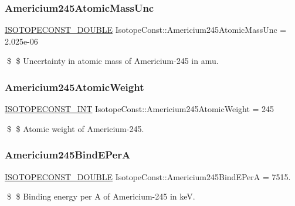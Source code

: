 \subsubsection{\texorpdfstring{Americium245\+Atomic\+Mass\+Unc}{Americium245AtomicMassUnc}}
{\footnotesize\ttfamily \mbox{\hyperlink{group___isotope_const-_macros_ga8f45a7272ce02c0b4c65c44636ed719a}{I\+S\+O\+T\+O\+P\+E\+C\+O\+N\+S\+T\+\_\+\+D\+O\+U\+B\+LE}} Isotope\+Const\+::\+Americium245\+Atomic\+Mass\+Unc = 2.\+025e-\/06}

\$ \$ Uncertainty in atomic mass of Americium-\/245 in amu. \mbox{\label{group___isotope_const-_americium-_am245_gafab58670e8d3d3e37ea662c4f2c9570b}} 
\subsubsection{\texorpdfstring{Americium245\+Atomic\+Weight}{Americium245AtomicWeight}}
{\footnotesize\ttfamily \mbox{\hyperlink{group___isotope_const-_macros_ga5f18360b3e99483a35c32d789e62621c}{I\+S\+O\+T\+O\+P\+E\+C\+O\+N\+S\+T\+\_\+\+I\+NT}} Isotope\+Const\+::\+Americium245\+Atomic\+Weight = 245}

\$ \$ Atomic weight of Americium-\/245. \mbox{\label{group___isotope_const-_americium-_am245_ga041e34cbf7275decb14b683bc0d50d92}} 
\subsubsection{\texorpdfstring{Americium245\+Bind\+E\+PerA}{Americium245BindEPerA}}
{\footnotesize\ttfamily \mbox{\hyperlink{group___isotope_const-_macros_ga8f45a7272ce02c0b4c65c44636ed719a}{I\+S\+O\+T\+O\+P\+E\+C\+O\+N\+S\+T\+\_\+\+D\+O\+U\+B\+LE}} Isotope\+Const\+::\+Americium245\+Bind\+E\+PerA = 7515.}

\$ \$ Binding energy per A of Americium-\/245 in keV. \mbox{\label{group___isotope_const-_americium-_am245_ga947c09432248c1d8080d6b3d6d77206d}} 
